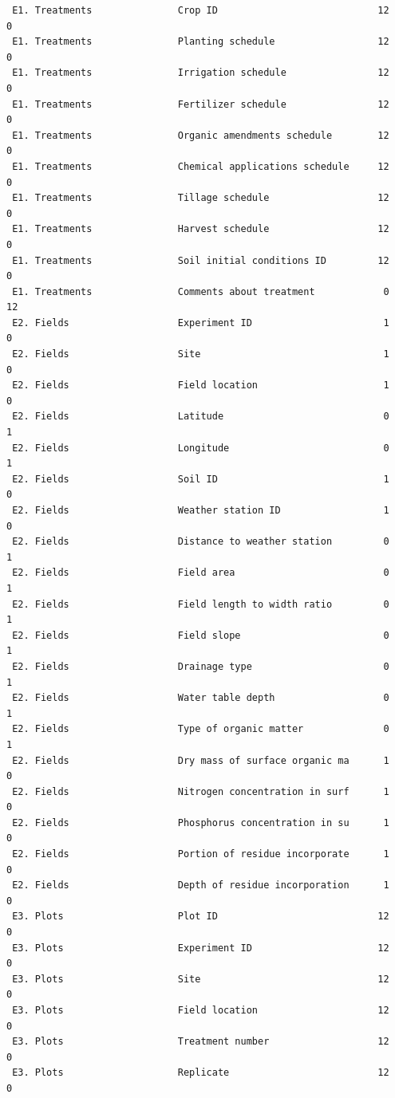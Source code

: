 \documentclass[
]{article}
\begin{document}
\begin{verbatim}
 E1. Treatments               Crop ID                            12       0
 E1. Treatments               Planting schedule                  12       0
 E1. Treatments               Irrigation schedule                12       0
 E1. Treatments               Fertilizer schedule                12       0
 E1. Treatments               Organic amendments schedule        12       0
 E1. Treatments               Chemical applications schedule     12       0
 E1. Treatments               Tillage schedule                   12       0
 E1. Treatments               Harvest schedule                   12       0
 E1. Treatments               Soil initial conditions ID         12       0
 E1. Treatments               Comments about treatment            0      12
 E2. Fields                   Experiment ID                       1       0
 E2. Fields                   Site                                1       0
 E2. Fields                   Field location                      1       0
 E2. Fields                   Latitude                            0       1
 E2. Fields                   Longitude                           0       1
 E2. Fields                   Soil ID                             1       0
 E2. Fields                   Weather station ID                  1       0
 E2. Fields                   Distance to weather station         0       1
 E2. Fields                   Field area                          0       1
 E2. Fields                   Field length to width ratio         0       1
 E2. Fields                   Field slope                         0       1
 E2. Fields                   Drainage type                       0       1
 E2. Fields                   Water table depth                   0       1
 E2. Fields                   Type of organic matter              0       1
 E2. Fields                   Dry mass of surface organic ma      1       0
 E2. Fields                   Nitrogen concentration in surf      1       0
 E2. Fields                   Phosphorus concentration in su      1       0
 E2. Fields                   Portion of residue incorporate      1       0
 E2. Fields                   Depth of residue incorporation      1       0
 E3. Plots                    Plot ID                            12       0
 E3. Plots                    Experiment ID                      12       0
 E3. Plots                    Site                               12       0
 E3. Plots                    Field location                     12       0
 E3. Plots                    Treatment number                   12       0
 E3. Plots                    Replicate                          12       0

\end{verbatim}
\end{document}
